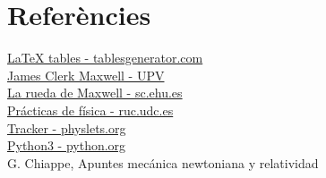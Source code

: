 \documentclass[11pt]{article}
\begin{document}
\section{Referències}   
    \href{https://www.tablesgenerator.com/}{LaTeX tables - tablesgenerator.com}\\

    \href{http://www.upv.es/antenas/Tema_1/james_clerk_maxwell.htm}{James Clerk Maxwell - UPV}\\

    \href{http://www.sc.ehu.es/sbweb/fisica3/solido/maxwell/maxwell.html}{La rueda de Maxwell - sc.ehu.es}\\

    \href{https://ruc.udc.es/dspace/bitstream/handle/2183/16600/LopezDiaz_AnaJesus_2005_Practicas_de_fisica.pdf}{Prácticas de física - ruc.udc.es}\\

    \href{https://physlets.org/tracker/}{Tracker - physlets.org}\\

    \href{https://www.python.org/}{Python3 - python.org}\\

    G. Chiappe, Apuntes mecánica newtoniana y relatividad
\end{document}
